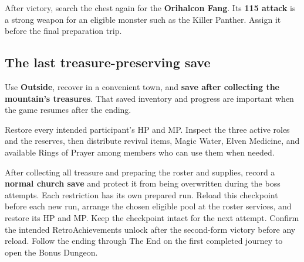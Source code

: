 After victory, search the chest again for the
\textbf{Orihalcon Fang}. Its \textbf{115 attack} is a
strong weapon for an eligible monster such as the Killer
Panther. Assign it before the final preparation trip.

\subsection*{The last treasure-preserving save}

Use \textbf{Outside}, recover in a convenient town,
and \textbf{save after collecting the mountain's treasures}.
That saved inventory and progress are important when the
game resumes after the ending.

Restore every intended participant's HP and MP. Inspect
the three active roles and the reserves, then distribute
revival items, Magic Water, Elven Medicine, and available
Rings of Prayer among members who can use them when needed.



After collecting all treasure and preparing the roster and supplies,
record a \textbf{normal church save} and protect it from being
overwritten during the boss attempts. Each restriction has its own
prepared run. Reload this checkpoint before each new run, arrange
the chosen eligible pool at the roster services, and restore its HP
and MP. Keep the checkpoint intact for the next attempt. Confirm the
intended RetroAchievements unlock after the second-form victory
before any reload. Follow the ending through The End on the first
completed journey to open the Bonus Dungeon.

